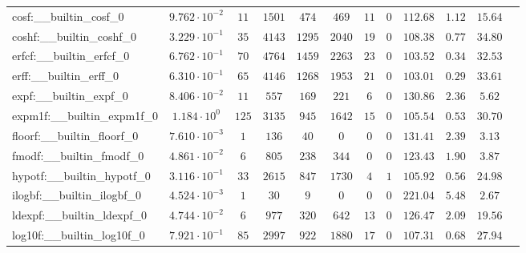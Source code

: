\begin{tabular}{|l|c|c|c|c|c|c|c|c|c|c|c|}
cosf:\_\_builtin\_cosf\_0                 & $ 9.762 \cdot 10^{-2} $ & $ 11     $ & $ 1501  $ & $ 474   $ & $ 469   $ & $ 11  $ & $ 0 $ & $ 112.68      $ & $ 1.12    $ & $ 15.64   $ \\
coshf:\_\_builtin\_coshf\_0               & $ 3.229 \cdot 10^{-1} $ & $ 35     $ & $ 4143  $ & $ 1295  $ & $ 2040  $ & $ 19  $ & $ 0 $ & $ 108.38      $ & $ 0.77    $ & $ 34.80   $ \\
erfcf:\_\_builtin\_erfcf\_0               & $ 6.762 \cdot 10^{-1} $ & $ 70     $ & $ 4764  $ & $ 1459  $ & $ 2263  $ & $ 23  $ & $ 0 $ & $ 103.52      $ & $ 0.34    $ & $ 32.53   $ \\
erff:\_\_builtin\_erff\_0                 & $ 6.310 \cdot 10^{-1} $ & $ 65     $ & $ 4146  $ & $ 1268  $ & $ 1953  $ & $ 21  $ & $ 0 $ & $ 103.01      $ & $ 0.29    $ & $ 33.61   $ \\
expf:\_\_builtin\_expf\_0                 & $ 8.406 \cdot 10^{-2} $ & $ 11     $ & $ 557   $ & $ 169   $ & $ 221   $ & $ 6   $ & $ 0 $ & $ 130.86      $ & $ 2.36    $ & $ 5.62    $ \\
expm1f:\_\_builtin\_expm1f\_0             & $ 1.184 \cdot 10^{0}  $ & $ 125    $ & $ 3135  $ & $ 945   $ & $ 1642  $ & $ 15  $ & $ 0 $ & $ 105.54      $ & $ 0.53    $ & $ 30.70   $ \\
floorf:\_\_builtin\_floorf\_0             & $ 7.610 \cdot 10^{-3} $ & $ 1      $ & $ 136   $ & $ 40    $ & $ 0     $ & $ 0   $ & $ 0 $ & $ 131.41      $ & $ 2.39    $ & $ 3.13    $ \\
fmodf:\_\_builtin\_fmodf\_0               & $ 4.861 \cdot 10^{-2} $ & $ 6      $ & $ 805   $ & $ 238   $ & $ 344   $ & $ 0   $ & $ 0 $ & $ 123.43      $ & $ 1.90    $ & $ 3.87    $ \\
hypotf:\_\_builtin\_hypotf\_0             & $ 3.116 \cdot 10^{-1} $ & $ 33     $ & $ 2615  $ & $ 847   $ & $ 1730  $ & $ 4   $ & $ 1 $ & $ 105.92      $ & $ 0.56    $ & $ 24.98   $ \\
ilogbf:\_\_builtin\_ilogbf\_0             & $ 4.524 \cdot 10^{-3} $ & $ 1      $ & $ 30    $ & $ 9     $ & $ 0     $ & $ 0   $ & $ 0 $ & $ 221.04      $ & $ 5.48    $ & $ 2.67    $ \\
ldexpf:\_\_builtin\_ldexpf\_0             & $ 4.744 \cdot 10^{-2} $ & $ 6      $ & $ 977   $ & $ 320   $ & $ 642   $ & $ 13  $ & $ 0 $ & $ 126.47      $ & $ 2.09    $ & $ 19.56   $ \\
log10f:\_\_builtin\_log10f\_0             & $ 7.921 \cdot 10^{-1} $ & $ 85     $ & $ 2997  $ & $ 922   $ & $ 1880  $ & $ 17  $ & $ 0 $ & $ 107.31      $ & $ 0.68    $ & $ 27.94   $ \\

\end{tabular}
